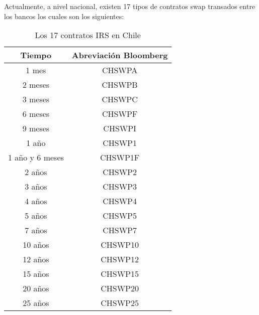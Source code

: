 \qquad Actualmente, a nivel nacional, existen 17 tipos de contratos swap transados entre los bancos los cuales son los siguientes:
\begin{table}[H]
\centering

    \begin{tabular}{| c | c |}
    \hline
    Tiempo & Abreviación Bloomberg \\ \hline
    1 mes & CHSWPA \\ \hline
    2 meses & CHSWPB \\ \hline
    3 meses & CHSWPC \\ \hline
    6 meses & CHSWPF \\ \hline
    9 meses & CHSWPI \\ \hline
    1 año & CHSWP1 \\ \hline
    1 año y 6 meses & CHSWP1F \\ \hline
    2 años & CHSWP2 \\ \hline
    3 años & CHSWP3 \\ \hline
    4 años & CHSWP4 \\ \hline
    5 años & CHSWP5 \\ \hline
    7 años & CHSWP7 \\ \hline
    10 años & CHSWP10 \\ \hline
    12 años & CHSWP12 \\ \hline
    15 años & CHSWP15 \\ \hline
    20 años & CHSWP20 \\ \hline
    25 años & CHSWP25 \\ \hline
\end{tabular}
\caption{Los 17 contratos IRS en Chile}\label{fig:tenores}

\end{table}
